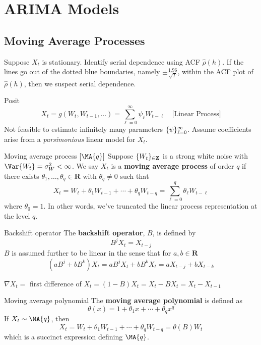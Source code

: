 \chapter{ARIMA Models}
\section{Moving Average Processes}
Suppose $ X_t $ is stationary. Identify serial
dependence using ACF $ \hat{\rho}(h) $.
If the lines go out of the dotted blue boundaries,
namely $ \pm \displaystyle \frac{1.96}{\sqrt{T}} $,
within the ACF plot of $ \hat{\rho}(h) $, then we suspect serial dependence.

Posit
\[ X_t=g(W_t,W_{t-1},\ldots)=\sum_{\ell=0}^{\infty} \psi_\ell W_{t-\ell}\quad
    \text{[Linear Process]} \]
Not feasible to estimate infinitely many parameters
$ \{\psi\}_{\ell=0}^{\infty} $. Assume coefficients
arise from a \emph{parsimonious} linear model for $ X_t $.
\begin{Definition}{Moving average process $ [\MA{q}] $}{}
    Suppose $ \{W_t\}_{\in\mathbf{Z}} $ is a strong
    white noise with $ \Var{W_t}=\sigma_W^2<\infty $.
    We say $ X_t $ is a \textbf{moving average process}
    of order $ q $ if there exists
    $ \theta_1,\ldots,\theta_q\in\mathbf{R} $ with $ \theta_q\ne 0 $
    such that
    \[ X_t=W_t+\theta_1W_{t-1}+\cdots+\theta_q W_{t-q}=\sum_{\ell=0}^{q}
        \theta_\ell W_{t-\ell} \]
    where $ \theta_0=1 $. In other words, we've truncated
    the linear process representation at the level $ q $.
\end{Definition}
\begin{Definition}{Backshift operator}{}
    The \textbf{backshift operator}, $ B $, is defined
    by
    \[ B^j X_t=X_{t-j} \]
    $ B $ is assumed further to be linear in the sense
    that for $ a,b\in\mathbf{R} $
    \[ (a B^j+b B^k)X_t=
        a B^j X_t+b B^k X_t=a X_{t-j}+b X_{t-k} \]
\end{Definition}
\begin{Example}{}{}
    $ \nabla X_t = $ first difference of $ X_t=(1-B)X_t=X_t-B X_t=X_t-X_{t-1} $
\end{Example}
\begin{Definition}{Moving average polynomial}{}
    The \textbf{moving average polynomial} is defined as
    \[ \theta(x)=1+\theta_1 x+\cdots+\theta_q x^q \]
    If $ X_t\sim\MA{q} $, then
    \[ X_t=W_t+\theta_1W_{t-1}+\cdots+\theta_q W_{t-q}=\theta(B)W_t \]
    which is a succinct expression defining $ \MA{q} $.
\end{Definition}
